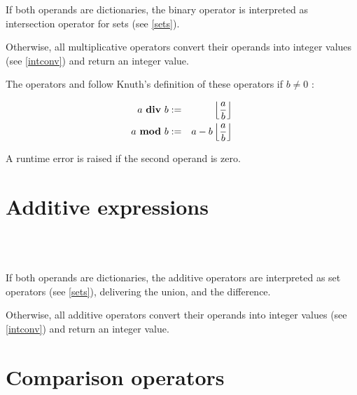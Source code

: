 \noindent
If both operands are dictionaries, the binary operator \token{*}
is interpreted as intersection
operator for sets (see \ref{sets}).

Otherwise, all multiplicative operators convert their operands into integer
values (see \ref{intconv}) and return an integer value.

The operators  and  follow
Knuth's definition of these operators if $b \not= 0$ \cite{Knuth:divmod}:

\begin{eqnarray*}
   a ~ \mbox{\keyword{div}} ~ b & := &
      \left\lfloor \frac{a}{b} \right\rfloor \\
   a ~ \mbox{\keyword{mod}} ~ b & := &
      a - b \left\lfloor \frac{a}{b} \right\rfloor
\end{eqnarray*}

\noindent
A runtime error is raised if the second operand is zero.

\section{Additive expressions}

\begin{grammar}
      \produces {} \\
      \produces {}
         \lextoken{+}  \\
      \produces {}
         \lextoken{-} 
\end{grammar}

\noindent
If both operands are dictionaries, the additive operators
are interpreted as set operators (see \ref{sets}),
\token{+} delivering the union,
and \token{-} the difference.

Otherwise, all additive operators convert their operands into integer
values (see \ref{intconv}) and return an integer value.

\section{Comparison operators}

